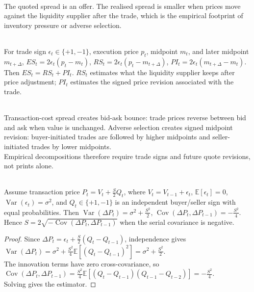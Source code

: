 \documentclass[a4paper,oneside,openany]{book}
\begin{document}
\begin{principle} \\
The quoted spread is an offer. The realised spread is smaller when prices move against the liquidity supplier after the trade, which is the empirical footprint of inventory pressure or adverse selection.
\end{principle}

\begin{model} \\
For trade sign $\epsilon_t\in\{+1,-1\}$, execution price $p_t$, midpoint $m_t$, and later midpoint $m_{t+\Delta}$, $ES_t=2\epsilon_t(p_t-m_t)$, $RS_t=2\epsilon_t(p_t-m_{t+\Delta})$, $PI_t=2\epsilon_t(m_{t+\Delta}-m_t)$. Then $ES_t=RS_t+PI_t$. $RS_t$ estimates what the liquidity supplier keeps after price adjustment; $PI_t$ estimates the signed price revision associated with the trade.
\end{model}

\begin{mechanism} \\
Transaction-cost spread creates bid-ask bounce: trade prices reverse between bid and ask when value is unchanged. Adverse selection creates signed midpoint revision: buyer-initiated trades are followed by higher midpoints and seller-initiated trades by lower midpoints.\\
Empirical decompositions therefore require trade signs and future quote revisions, not prints alone.
\end{mechanism}

\begin{proposition} \\
Assume transaction price $P_t=V_t+\frac{S}{2}Q_t$, where $V_t=V_{t-1}+\epsilon_t$, $\mathbb{E}[\epsilon_t]=0$, $\operatorname{Var}(\epsilon_t)=\sigma^2$, and $Q_t\in\{+1,-1\}$ is an independent buyer/seller sign with equal probabilities. Then $\operatorname{Var}(\Delta P_t)=\sigma^2+\frac{S^2}{2}$, $\operatorname{Cov}(\Delta P_t,\Delta P_{t-1})=-\frac{S^2}{4}$.\\
Hence $S=2\sqrt{-\operatorname{Cov}(\Delta P_t,\Delta P_{t-1})}$ when the serial covariance is negative.
\begin{proof}
Since $\Delta P_t=\epsilon_t+\frac{S}{2}(Q_t-Q_{t-1})$, independence gives $\operatorname{Var}(\Delta P_t)=\sigma^2+\frac{S^2}{4}\mathbb{E}[(Q_t-Q_{t-1})^2]=\sigma^2+\frac{S^2}{2}$.\\
The innovation terms have zero cross-covariance, so $\operatorname{Cov}(\Delta P_t,\Delta P_{t-1}) =\frac{S^2}{4}\mathbb{E}[(Q_t-Q_{t-1})(Q_{t-1}-Q_{t-2})] =-\frac{S^2}{4}$.\\
Solving gives the estimator.
\end{proof}
\end{proposition}
\end{document}
